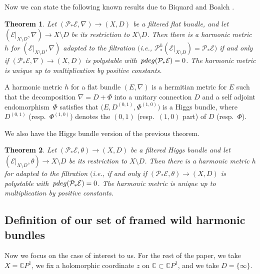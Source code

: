 \documentclass[11pt]{article}
\numberwithin{equation}{section}
\newtheorem{Theorem}{Theorem}[section]
\numberwithin{equation}{section}
\newcommand{\CP}{\mathbb{C}P^1}
\begin{document}
Now we can state the following known results due to Biquard and Boalch \cite{BB04}.

\begin{Theorem} \label{HMFB} Let $(\mathcal{P}_*\mathcal{E},\nabla)\to (X,D)$ be a filtered flat bundle, and let $(\mathcal{E}|_{X\setminus D},\nabla) \to X\setminus D$ be its restriction to $X\setminus D$. Then there is a harmonic metric $h$ for $(\mathcal{E}|_{X\setminus D},\nabla)$ adapted to the filtration $\bigl($i.e., $\mathcal{P}^h_*(\mathcal{E}|_{X\setminus D})=\mathcal{P}_*\mathcal{E}\bigr)$ if and only if $(\mathcal{P}_*\mathcal{E},\nabla)\to (X,D)$ is polystable with~$\textnormal{pdeg}(\mathcal{P}_*\mathcal{E})=0$. The harmonic metric is unique up to multiplication by positive constants.
\end{Theorem}

\begin{Remark} A harmonic metric $h$ for a flat bundle $(E,\nabla)$ is a hermitian metric for $E$ such that the decomposition $\nabla=D+\Phi$ into a unitary connection $D$ and a self adjoint endomorphism~$\Phi$ satisfies that $\bigl(E,D^{(0,1)},\Phi^{(1,0)}\bigr)$ is a Higgs bundle, where $D^{(0,1)}$ \big(resp.\ $\Phi^{(1,0)}$\big) denotes the $(0,1)$ (resp.\ $(1,0)$ part) of $D$ (resp.\ $\Phi$).
\end{Remark}

We also have the Higgs bundle version of the previous theorem.

\begin{Theorem} \label{HMHB} Let $(\mathcal{P}_*\mathcal{E},\theta)\to (X,D)$ be a filtered Higgs bundle and let $(\mathcal{E}|_{X\setminus D},\theta) \to X\setminus D$ be its restriction to $X\setminus D$. Then there is a harmonic metric $h$ for  adapted to the filtration $\bigl($i.e.,  if and only if $(\mathcal{P}_*\mathcal{E},\theta)\to (X,D)$ is polystable with~$\textnormal{pdeg}(\mathcal{P}_*\mathcal{E})=0$. The harmonic metric is unique up to multiplication by positive constants.
\end{Theorem}

\subsection{Definition of our set of framed wild harmonic bundles}\label{secdeffwhb}

Now we focus on the case of interest to us. For the rest of the paper, we take $X=\CP$, we fix a holomorphic coordinate $z$ on $\mathbb{C}\subset \CP$, and we take $D=\{\infty\}$.
\end{document}
